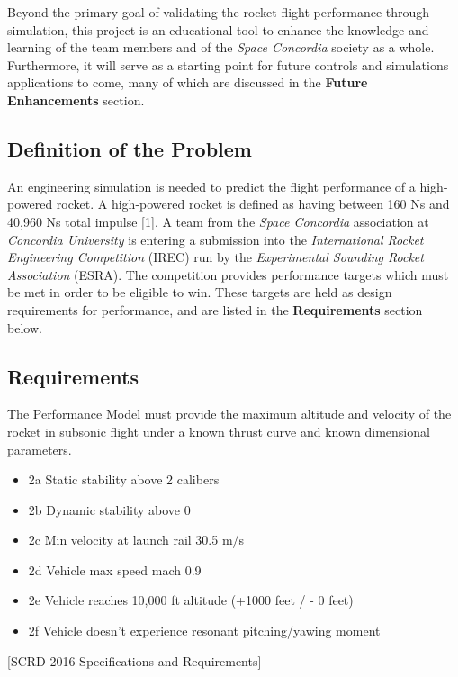 \documentclass[]{article}
\providecommand{\tightlist}{%
  \setlength{\itemsep}{0pt}\setlength{\parskip}{0pt}}
\begin{document}
Beyond the primary goal of validating the rocket flight performance
through simulation, this project is an educational tool to enhance the
knowledge and learning of the team members and of the \emph{Space
Concordia} society as a whole. Furthermore, it will serve as a starting
point for future controls and simulations applications to come, many of
which are discussed in the \textbf{Future Enhancements} section.

\subsection{Definition of the Problem}\label{definition-of-the-problem}

An engineering simulation is needed to predict the flight performance of
a high-powered rocket. A high-powered rocket is defined as having
between 160 Ns and 40,960 Ns total impulse {[}1{]}. A team from the
\emph{Space Concordia} association at \emph{Concordia University} is
entering a submission into the \emph{International Rocket Engineering
Competition} (IREC) run by the \emph{Experimental Sounding Rocket
Association} (ESRA). The competition provides performance targets which
must be met in order to be eligible to win. These targets are held as
design requirements for performance, and are listed in the
\textbf{Requirements} section below.

\subsection{Requirements}\label{requirements}

The Performance Model must provide the maximum altitude and velocity of
the rocket in subsonic flight under a known thrust curve and known
dimensional parameters.

\begin{itemize}
\tightlist
\item
  2a Static stability above 2 calibers
\item
  2b Dynamic stability above 0
\item
  2c Min velocity at launch rail 30.5 m/s
\item
  2d Vehicle max speed mach 0.9
\item
  2e Vehicle reaches 10,000 ft altitude (+1000 feet / - 0 feet)
\item
  2f Vehicle doesn't experience resonant pitching/yawing moment
\end{itemize}

{[}SCRD 2016 Specifications and Requirements{]}
\end{document}
